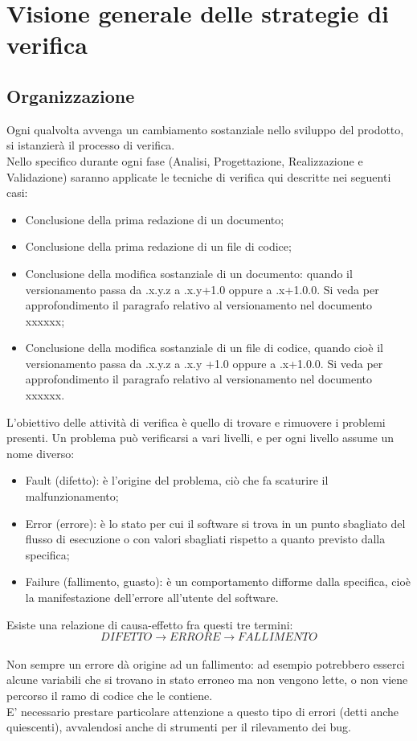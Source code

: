 \section{Visione generale delle strategie di verifica}{
\subsection{Organizzazione}{
	Ogni qualvolta avvenga un cambiamento sostanziale nello sviluppo del prodotto, si istanzierà il processo di verifica. \\
	Nello specifico durante ogni fase (Analisi, Progettazione, Realizzazione e Validazione) saranno applicate le tecniche di verifica qui descritte nei seguenti casi:
	\begin{itemize}
		\item Conclusione della prima redazione di un documento;
		\item Conclusione della prima redazione di un file di codice;
		\item Conclusione della modifica sostanziale di un documento: quando il versionamento passa da .x.y.z a .x.y+1.0 oppure a .x+1.0.0. Si veda per approfondimento il paragrafo relativo al versionamento nel documento xxxxxx;
		\item Conclusione della modifica sostanziale di un file di codice, quando cioè il versionamento passa da .x.y.z a .x.y +1.0 oppure a .x+1.0.0. Si veda per approfondimento il paragrafo relativo al versionamento nel documento xxxxxx.
	\end{itemize}
	L'obiettivo delle attività di verifica è quello di trovare e rimuovere i problemi presenti. Un problema può verificarsi a vari livelli, e per ogni livello assume un nome diverso:
	\begin{itemize}
		\item Fault (difetto): è l'origine del problema, ciò che fa scaturire il malfunzionamento;
		\item Error (errore): è lo stato per cui il software si trova in un punto sbagliato del flusso di esecuzione o con valori sbagliati rispetto a quanto previsto dalla specifica;
		\item Failure (fallimento, guasto): è un comportamento difforme dalla specifica, cioè la manifestazione dell'errore all'utente del software.
	\end{itemize}
	Esiste una relazione di causa-effetto fra questi tre termini:\\
	\[DIFETTO\longrightarrow ERRORE\longrightarrow FALLIMENTO\]\\
	Non sempre un errore dà origine ad un fallimento: ad esempio potrebbero esserci alcune variabili che si trovano in stato erroneo ma non vengono lette, o non viene percorso il ramo di codice che le contiene.\\
	E' necessario prestare particolare attenzione a questo tipo di errori (detti anche quiescenti), avvalendosi anche di strumenti per il rilevamento dei bug.
}
}
